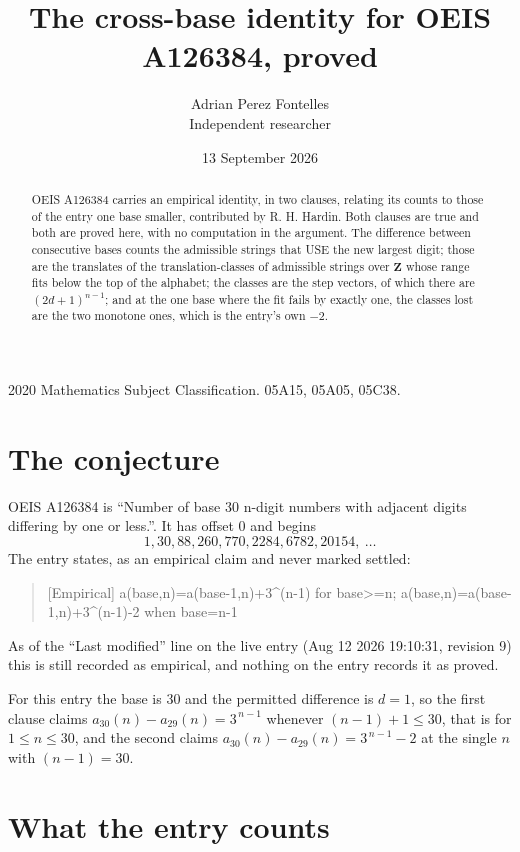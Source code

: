 \documentclass[11pt,a4paper]{article}
\title{The cross-base identity for OEIS A126384, proved}
\author{Adrian Perez Fontelles\\ \small Independent researcher}
\date{13 September 2026}
\theoremstyle{plain}
\theoremstyle{definition}
\begin{document}
\maketitle

\begin{abstract}
OEIS A126384 carries an empirical identity, in two clauses, relating its counts to those of the
entry one base smaller, contributed by R. H. Hardin. Both clauses are true and both are proved
here, with no computation in the argument. The difference between consecutive bases counts the
admissible strings that USE the new largest digit; those are the translates of the
translation-classes of admissible strings over $\mathbf{Z}$ whose range fits below the top of
the alphabet; the classes are the step vectors, of which there are $(2d+1)^{n-1}$; and at the
one base where the fit fails by exactly one, the classes lost are the two monotone ones, which
is the entry's own $-2$.
\end{abstract}

\noindent\small 2020 Mathematics Subject Classification. 05A15, 05A05, 05C38.\normalsize

\section{The conjecture}

OEIS A126384 is ``Number of base 30 n-digit numbers with adjacent digits differing by one or less.''. It has offset $0$ and begins
\[
1, 30, 88, 260, 770, 2284, 6782, 20154,\ \dots
\]
The entry states, as an empirical claim and never marked settled:
\begin{quote}
[Empirical] a(base,n)=a(base-1,n)+3\textasciicircum{}(n-1) for base>=n; a(base,n)=a(base-1,n)+3\textasciicircum{}(n-1)-2 when base=n-1
\end{quote}
As of the ``Last modified'' line on the live entry (Aug 12 2026 19:10:31, revision 9)
this is still recorded as empirical, and nothing on the entry records it as proved.

For this entry the base is $30$ and the permitted difference is $d=1$, so the first clause
claims $a_{30}(n)-a_{29}(n)=3^{\,n-1}$ whenever $(n-1)+1\le30$, that is for
$1\le n\le30$, and the second claims $a_{30}(n)-a_{29}(n)=3^{\,n-1}-2$ at the single
$n$ with $(n-1)=30$.

\section{What the entry counts}
\end{document}
